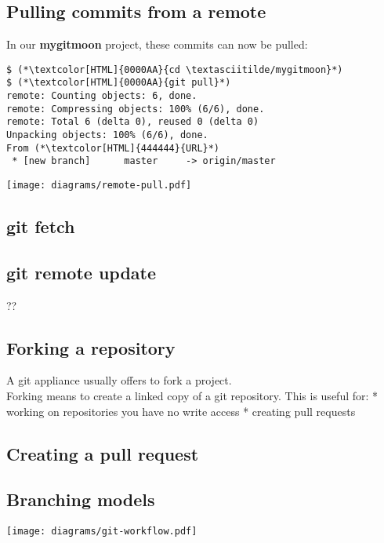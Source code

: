 \subsection{Pulling commits from a remote}
\begin{frame}[fragile]
  \subslidetitle
  In our \textbf{mygitmoon} project, these commits can now be pulled:
  \begin{lstlisting}
$ (*\textcolor[HTML]{0000AA}{cd \textasciitilde/mygitmoon}*)
$ (*\textcolor[HTML]{0000AA}{git pull}*)
remote: Counting objects: 6, done.
remote: Compressing objects: 100% (6/6), done.
remote: Total 6 (delta 0), reused 0 (delta 0)
Unpacking objects: 100% (6/6), done.
From (*\textcolor[HTML]{444444}{URL}*)
 * [new branch]      master     -> origin/master
\end{lstlisting}
\center \texttt{[image: diagrams/remote-pull.pdf]}
\end{frame}

\subsection{git fetch}
\begin{frame}[fragile]
  \subslidetitle
\end{frame}

\subsection{git remote update}
\begin{frame}[fragile]
  \subslidetitle
  ??
\end{frame}

\subsection{Forking a repository}
\begin{frame}[fragile]
  \subslidetitle
  A git appliance usually offers to fork a project.\\
  Forking means to create a linked copy of a git repository.
  \vspace{1em}
  This is useful for:
  * working on repositories you have no write access
  * creating pull requests
\end{frame}

\subsection{Creating a pull request}
\begin{frame}[fragile]
  \subslidetitle
\end{frame}

\subsection{Branching models}
\begin{frame}[fragile]
  \subslidetitle
  \center \texttt{[image: diagrams/git-workflow.pdf]}
\end{frame}
